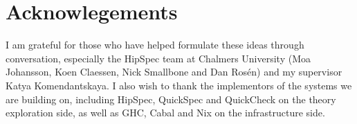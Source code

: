 \documentclass[]{article}
\begin{document}
\section{Acknowlegements}\label{acknowlegements}

I am grateful for those who have helped formulate these ideas through
conversation, especially the HipSpec team at Chalmers University (Moa
Johansson, Koen Claessen, Nick Smallbone and Dan Rosén) and my
supervisor Katya Komendantskaya. I also wish to thank the implementors
of the systems we are building on, including HipSpec, QuickSpec and
QuickCheck on the theory exploration side, as well as GHC, Cabal and Nix
on the infrastructure side.

 
\end{document}
